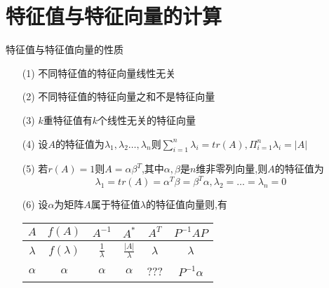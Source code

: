 \documentclass[12pt, a4paper, oneside, UTF8]{ctexbook}
\begin{document}
\section{特征值与特征向量的计算}
\begin{remark}
    特征值与特征值向量的性质
    \begin{enumerate}
        \item [(1)] 不同特征值的特征向量线性无关 
        \item [(2)] 不同特征值的特征向量之和不是特征向量
        \item [(3)] $k\text{重特征值有}k\text{个线性无关的特征向量}$ 
        \item [(4)] 设$A$的特征值为$\lambda_1,\lambda_2\ldots,\lambda_n$则$\displaystyle \sum_{i=1}^{n}\lambda_i=tr(A),\Pi_{i=1}^{n}\lambda_i=\left|A\right|$ 
        \item [(5)] 若$r(A)=1$则$A=\alpha\beta^{T}$,其中$\alpha,\beta$是$n$维非零列向量,则$A$的特征值为 
        $$
        \lambda_1=tr(A)=\alpha^T\beta=\beta^T\alpha, \lambda_2=\ldots=\lambda_n = 0
        $$
        \item [(6)] 设$\alpha$为矩阵$A$属于特征值$\lambda$的特征值向量则,有 
        \begin{center}
            \begin{tabular}{ |c|c|c|c|c|c| }
                \hline
                $A$ & $f(A)$ & $A^{-1}$ & $A^*$ & $A^T$ & $P^{-1}AP$  \\
                \hline
                $\lambda$ & $f(\lambda)$ & $\frac{1}{\lambda}$ & $\frac{\left|A\right|}{\lambda}$ & $\lambda$ & $\lambda$ \\
                \hline 
                $\alpha$ & $\alpha$ & $\alpha$ & $\alpha$ & ??? & $P^{-1}\alpha$ \\
                \hline
            \end{tabular}
        \end{center}
    \end{enumerate}
\end{remark}
\end{document}
